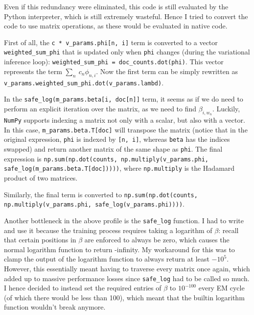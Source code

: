 \documentclass[12pt,a4paper,twoside,openright]{report}
\begin{document}
Even if this redundancy were eliminated, this code is still evaluated by the Python interpreter, which is still extremely wasteful. Hence I tried to convert the code to use matrix operations, as these would be evaluated in native code.

First of all, the \texttt{c * v\_params.phi[n, i]} term is converted to a vector \texttt{weighted\_sum\_phi} that is updated only when \texttt{phi} changes (during the variational inference loop): \texttt{weighted\_sum\_phi = doc\_counts.dot(phi)}. This vector represents the term $\sum\limits_n\ c_n\phi_{n, i}$. Now the first term can be simply rewritten as \texttt{v\_params.weighted\_sum\_phi.dot(v\_params.lambd)}.

In the \texttt{safe\_log(m\_params.beta[i, doc[n]]} term, it seems as if we do need to perform an explicit iteration over the matrix, as we need to find $\beta_{i, w_n}$. Luckily, \texttt{NumPy} supports indexing a matrix not only with a scalar, but also with a vector. In this case, \texttt{m\_params.beta.T[doc]} will transpose the matrix (notice that in the original expression, \texttt{phi} is indexed by \texttt{[n, i]}, whereas \texttt{beta} has the indices swapped) and return another matrix of the same shape as \texttt{phi}. The final expression is \texttt{np.sum(np.dot(counts, np.multiply(v\_params.phi, safe\_log(m\_params.beta.T[doc]))))}, where \texttt{np.multiply} is the Hadamard product of two matrices.

Similarly, the final term is converted to \texttt{np.sum(np.dot(counts, np.multiply(v\_params.phi, safe\_log(v\_params.phi))))}.

Another bottleneck in the above profile is the \texttt{safe\_log} function. I had to write and use it because the training process requires taking a logarithm of $\beta$: recall that certain positions in $\beta$ are enforced to always be zero, which causes the normal logarithm function to return -infinity. My workaround for this was to clamp the output of the logarithm function to always return at least $-10^5$. However, this essentially meant having to traverse every matrix once again, which added up to massive performance losses since \texttt{safe\_log} had to be called so much. I hence decided to instead set the required entries of $\beta$ to $10^{-100}$ every EM cycle (of which there would be less than 100), which meant that the builtin logarithm function wouldn't break anymore.
\end{document}
